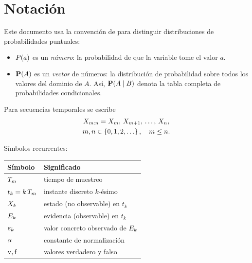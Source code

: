 \section{Notaci\'on}
\label{sec:notacion}

Este documento usa la convenci\'on de \cite{russell} para distinguir
distribuciones de probabilidades puntuales:

\begin{itemize}
  \item $P(a)$ es un \emph{n\'umero}: la probabilidad de que la variable
    tome el valor $a$.
  \item $\mathbf{P}(A)$ es un \emph{vector} de n\'umeros: la distribuci\'on de
    probabilidad sobre todos los valores del dominio de $A$. As\'i,
    $\mathbf{P}(A\mid B)$ denota la tabla completa de probabilidades
    condicionales.
\end{itemize}

Para secuencias temporales se escribe
\begin{equation}
  \label{eq:notacion_secuencia}
  \begin{gathered}
    \Xr{m}{n} = \X{m},\,\X{m+1},\,\dots,\,\X{n},\\
    m,n\in\set{0,1,2,\dots},\quad m\le n .
  \end{gathered}
\end{equation}

S\'imbolos recurrentes:

\begin{center}
\small
\begin{tabular}{@{}ll@{}}
  \toprule
  S\'imbolo & Significado \\
  \midrule
  $T_m$        & tiempo de muestreo \\
  $t_k=k\,T_m$ & instante discreto $k$-\'esimo \\
  $X_{k}$      & estado (no observable) en $t_k$ \\
  $E_{k}$     & evidencia (observable) en $t_k$ \\
  $e_{k}$     & valor concreto observado de $E_{k}$ \\
  $\alpha$        & constante de normalizaci\'on \\
  $\mathrm{v},\mathrm{f}$ & valores verdadero y falso \\
  \bottomrule
\end{tabular}
\end{center}
